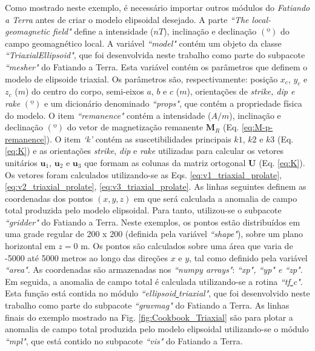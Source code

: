 Como mostrado neste exemplo, é necessário importar outros módulos do \textit{Fatiando a Terra} antes de criar o modelo elipsoidal desejado.
A parte \textit{``The local-geomagnetic field"} define a intensidade ($nT$), inclinação e declinação $(º)$ do campo geomagnético local.
A variável \textit{``model"} contém um objeto da classe \textit{``TriaxialEllipsoid"}, que foi desenvolvida neste trabalho como parte do subpacote \textit{``mesher"} do Fatiando a Terra. Esta variável contém os parâmetros que definem o modelo de elipsoide triaxial. Os parâmetros são, respectivamente: posição $x_c$, $y_c$ e $z_c$ ($m$) do centro do corpo, semi-eixos $a$, $b$ e $c$ ($m$), orientações de \textit{strike, dip e rake} $(º)$ e um dicionário denominado \textit{``props"}, que contém a propriedade física do  modelo. O item \textit{``remanence"} contém a intensidade ($A/m$), inclinação e declinação $(º)$ do vetor de magnetização remanente $\mathbf{M}_{R}$ (Eq. \ref{eq:M-p-remanence}). O item \textit{`k'} contém as suscetibilidades principais $k1$, $k2$ e $k3$ (Eq. \ref{eq:K}) e as orientações \textit{strike}, \textit{dip} e \textit{rake} utilizadas para calcular os vetores unitários $\mathbf{u}_{1}$, $\mathbf{u}_{2}$ e $\mathbf{u}_{3}$ que formam as colunas da matriz ortogonal $\mathbf{U}$ (Eq. \ref{eq:K}). Os vetores foram calculados utilizando-se as Eqs. \ref{eq:v1_triaxial_prolate},
\ref{eq:v2_triaxial_prolate}, \ref{eq:v3_triaxial_prolate}.
As linhas seguintes definem as coordenadas dos pontos $(x, y, z)$ em que será calculada a anomalia de campo total produzida pelo modelo elipsoidal.
Para tanto, utilizou-se o subpacote \textit{``gridder"} do Fatiando a Terra. Neste exemplos, os pontos estão distribuídos em uma grade regular de 200 x 200 (definida pela variável \textit{``shape"}), sobre um plano horizontal em $z = 0$ m. Os pontos são calculados sobre uma área que varia de -5000 até 5000 metros ao longo das direções $x$ e $y$, tal como definido pela variável \textit{``area"}.
As coordenadas são armazenadas nos \textit{``numpy arrays"}: \textit{``xp", ``yp" e ``zp"}. Em seguida, a anomalia de campo total é calculada utilizando-se a rotina \textit{``tf\underline{ }c"}. Esta função está contida no módulo \textit{``ellipsoid\underline{ }triaxial"}, que foi desenvolvido neste trabalho como parte do subpacote \textit{``gravmag"} do Fatiando a Terra. As linhas finais do exemplo mostrado na Fig. \ref{fig:Cookbook_Triaxial} são para plotar a anomalia de campo total produzida pelo modelo elipsoidal utilizando-se o módulo \textit{``mpl"}, que está contido no subpacote \textit{``vis"} do Fatiando a Terra.

